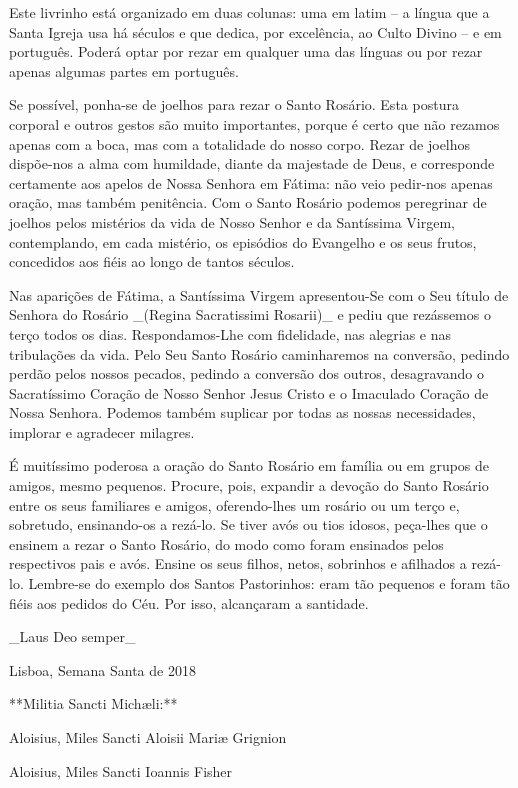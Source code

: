 Este livrinho está organizado em duas colunas: uma em latim – a língua que a Santa Igreja usa há séculos e que dedica, por excelência, ao Culto Divino – e em português. Poderá optar por rezar em qualquer uma das línguas ou por rezar apenas algumas partes em português.

Se possível, ponha-se de joelhos para rezar o Santo Rosário. Esta postura corporal e outros gestos são muito importantes, porque é certo que não rezamos apenas com a boca, mas com a totalidade do nosso corpo. Rezar de joelhos dispõe-nos a alma com humildade, diante da majestade de Deus, e corresponde certamente aos apelos de Nossa Senhora em Fátima: não veio pedir-nos apenas oração, mas também penitência. Com o Santo Rosário podemos peregrinar de joelhos pelos mistérios da vida de Nosso Senhor e da Santíssima Virgem, contemplando, em cada mistério, os episódios do Evangelho e os seus frutos, concedidos aos fiéis ao longo de tantos séculos.

Nas aparições de Fátima, a Santíssima Virgem apresentou-Se com o Seu título de Senhora do Rosário _(Regina Sacratissimi Rosarii)_ e pediu que rezássemos o terço todos os dias. Respondamos-Lhe com fidelidade, nas alegrias e nas tribulações da vida. Pelo Seu Santo Rosário caminharemos na conversão, pedindo perdão pelos nossos pecados, pedindo a conversão dos outros, desagravando o Sacratíssimo Coração de Nosso Senhor Jesus Cristo e o Imaculado Coração de Nossa Senhora. Podemos também suplicar por todas as nossas necessidades, implorar e agradecer milagres.

É muitíssimo poderosa a oração do Santo Rosário em família ou em grupos de amigos, mesmo pequenos. Procure, pois, expandir a devoção do Santo Rosário entre os seus familiares e amigos, oferendo-lhes um rosário ou um terço e, sobretudo, ensinando-os a rezá-lo. Se tiver avós ou tios idosos, peça-lhes que o ensinem a rezar o Santo Rosário, do modo como foram ensinados pelos respectivos pais e avós. Ensine os seus filhos, netos, sobrinhos e afilhados a rezá-lo. Lembre-se do exemplo dos Santos Pastorinhos: eram tão pequenos e foram tão fiéis aos pedidos do Céu. Por isso, alcançaram a santidade.

_Laus Deo semper_

Lisboa, Semana Santa de 2018


**Militia Sancti Michæli:**

Aloisius, Miles Sancti Aloisii Mariæ Grignion

Aloisius, Miles Sancti Ioannis Fisher

